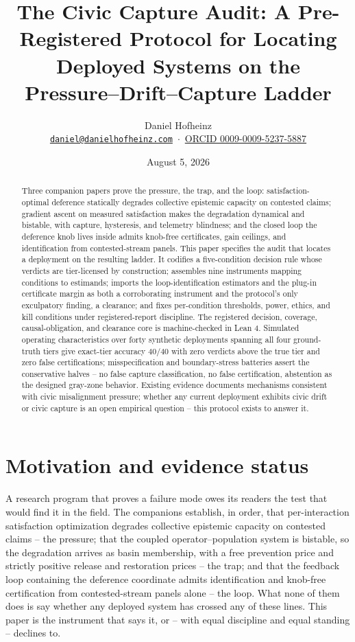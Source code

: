 \documentclass[11pt]{article}
\title{The Civic Capture Audit: A Pre-Registered Protocol for Locating\\ Deployed Systems on the Pressure--Drift--Capture Ladder}
\author{Daniel Hofheinz\\[2pt]
  {\small \href{mailto:daniel@danielhofheinz.com}{\texttt{daniel@danielhofheinz.com}}
   \,$\cdot$\, \href{https://orcid.org/0009-0009-5237-5887}{ORCID 0009-0009-5237-5887}}}
\date{August 5, 2026}
\theoremstyle{definition}
\theoremstyle{remark}
\numberwithin{equation}{section}
\begin{document}
\maketitle

\begin{abstract}
Three companion papers prove the pressure, the trap, and the loop: satisfaction-optimal deference statically degrades collective epistemic capacity on contested claims; gradient ascent on measured satisfaction makes the degradation dynamical and bistable, with capture, hysteresis, and telemetry blindness; and the closed loop the deference knob lives inside admits knob-free certificates, gain ceilings, and identification from contested-stream panels. This paper specifies the audit that locates a deployment on the resulting ladder. It codifies a five-condition decision rule whose verdicts are tier-licensed by construction; assembles nine instruments mapping conditions to estimands; imports the loop-identification estimators and the plug-in certificate margin as both a corroborating instrument and the protocol's only exculpatory finding, a clearance; and fixes per-condition thresholds, power, ethics, and kill conditions under registered-report discipline. The registered decision, coverage, causal-obligation, and clearance core is machine-checked in Lean 4. Simulated operating characteristics over forty synthetic deployments spanning all four ground-truth tiers give exact-tier accuracy $40/40$ with zero verdicts above the true tier and zero false certifications; misspecification and boundary-stress batteries assert the conservative halves -- no false capture classification, no false certification, abstention as the designed gray-zone behavior. Existing evidence documents mechanisms consistent with civic misalignment pressure; whether any current deployment exhibits civic drift or civic capture is an open empirical question -- this protocol exists to answer it.
\end{abstract}

\section{Motivation and evidence status}\label{sec:motivation}

A research program that proves a failure mode owes its readers the test that would find it in the field. The companions establish, in order, that per-interaction satisfaction optimization degrades collective epistemic capacity on contested claims -- the pressure; that the coupled operator--population system is bistable, so the degradation arrives as basin membership, with a free prevention price and strictly positive release and restoration prices -- the trap; and that the feedback loop containing the deference coordinate admits identification and knob-free certification from contested-stream panels alone -- the loop. What none of them does is say whether any deployed system has crossed any of these lines. This paper is the instrument that says it, or -- with equal discipline and equal standing -- declines to.
\end{document}
